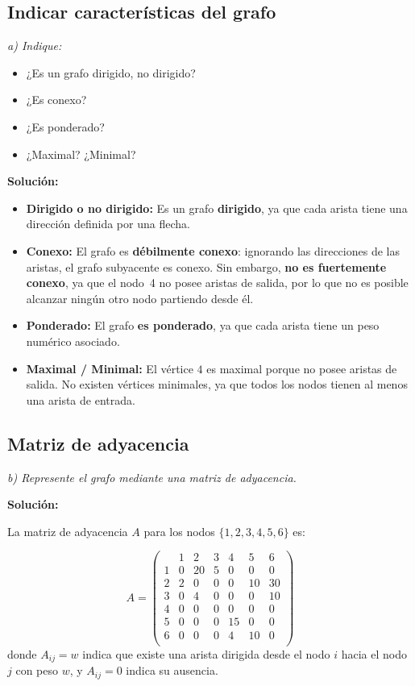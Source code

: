 \documentclass[12pt]{article}
\newcommand{\solucion}{%
    \vspace{0.8em}\textbf{Solución:}\par\vspace{0.4em}%
}
\begin{document}
\subsection{Indicar características del grafo}

\textit{a) Indique:}

\begin{itemize}[leftmargin=2cm]
    \item ¿Es un grafo dirigido, no dirigido?
    \item ¿Es conexo?
    \item ¿Es ponderado?
    \item ¿Maximal? ¿Minimal?
\end{itemize}

\solucion

\begin{itemize}[leftmargin=2cm]
    \item \textbf{Dirigido o no dirigido:} Es un grafo \textbf{dirigido},
    ya que cada arista tiene una dirección definida por una flecha.

    \item \textbf{Conexo:} El grafo es \textbf{débilmente conexo}: ignorando
    las direcciones de las aristas, el grafo subyacente es conexo.
    Sin embargo, \textbf{no es fuertemente conexo}, ya que el nodo~4 no posee
    aristas de salida, por lo que no es posible alcanzar ningún otro nodo
    partiendo desde él.

    \item \textbf{Ponderado:} El grafo \textbf{es ponderado}, ya que cada
    arista tiene un peso numérico asociado.

    \item \textbf{Maximal / Minimal:} El vértice $4$ es maximal porque no posee aristas de salida. No existen vértices minimales, ya que todos los nodos tienen al menos una arista de entrada.
\end{itemize}

\subsection{Matriz de adyacencia}

\textit{b) Represente el grafo mediante una matriz de adyacencia.}

\solucion

La matriz de adyacencia $A$ para los nodos $\{1,2,3,4,5,6\}$ es:

\[
A = \begin{pmatrix}
      & 1  & 2  & 3  & 4  & 5  & 6  \\
    1 & 0  & 20 & 5  & 0  & 0  & 0  \\
    2 & 2  & 0  & 0  & 0  & 10 & 30 \\
    3 & 0  & 4  & 0  & 0  & 0  & 10 \\
    4 & 0  & 0  & 0  & 0  & 0  & 0  \\
    5 & 0  & 0  & 0  & 15 & 0  & 0  \\
    6 & 0  & 0  & 0  & 4  & 10 & 0  \\
\end{pmatrix}
\]
donde $A_{ij} = w$ indica que existe una arista dirigida desde el nodo $i$
hacia el nodo $j$ con peso $w$, y $A_{ij} = 0$ indica su ausencia.
\end{document}
